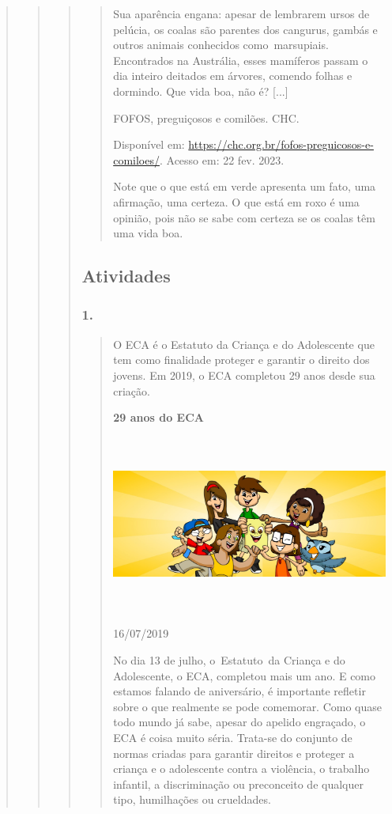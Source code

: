 \begin{quote}
\begin{quote}
\begin{quote}
\begin{quote}
Sua aparência engana: apesar de lembrarem ursos de pelúcia, os coalas
são parentes dos cangurus, gambás e outros animais conhecidos
como~marsupiais. Encontrados na Austrália, esses mamíferos passam o dia
inteiro deitados em árvores, comendo folhas e dormindo. Que vida boa,
não é? {[}...{]}

FOFOS, preguiçosos e comilões. CHC.

Disponível em: \url{https://chc.org.br/fofos-preguicosos-e-comiloes/}.
Acesso em: 22 fev. 2023.

Note que o que está em verde apresenta um fato, uma afirmação, uma
certeza. O que está em roxo é uma opinião, pois não se sabe com certeza
se os coalas têm uma vida boa.
\end{quote}

\subsection{Atividades}\label{atividades-7}

\subsubsection{1. }\label{section-60}

\begin{quote}
O ECA é o Estatuto da Criança e do Adolescente que tem como finalidade
proteger e garantir o direito dos jovens. Em 2019, o ECA completou 29
anos desde sua criação.

\textbf{29 anos do ECA}

\includegraphics[width=5.90556in,height=2.30417in]{media/image26.jpeg}

16/07/2019~

No dia 13 de julho, o~Estatuto~da Criança e do Adolescente, o ECA,
completou mais um ano. E como estamos falando de aniversário, é
importante refletir sobre o que realmente se pode comemorar. Como quase
todo mundo já sabe, apesar do apelido engraçado, o ECA é coisa muito
séria. Trata-se do conjunto de normas criadas para garantir direitos e
proteger a criança e o adolescente contra a violência, o trabalho
infantil, a discriminação ou preconceito de qualquer tipo, humilhações
ou crueldades.


\end{quote}
\end{quote}
\end{quote}
\end{quote}

